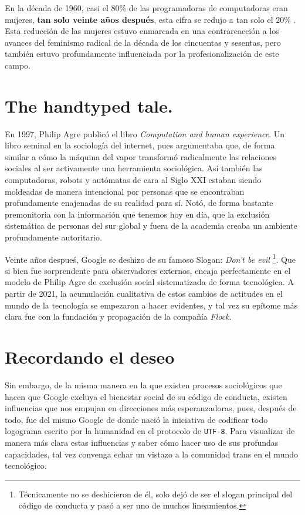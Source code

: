 \documentclass{article}
\begin{document}
	En la década de 1960, casi el 80\% de las programadoras de computadoras eran mujeres, \textbf{tan solo veinte años después}, esta cifra se redujo a tan solo el 20\% \cite{takeover}. Esta reducción de las mujeres estuvo enmarcada en una contrareacción a los avances del feminismo radical de la década de los cincuentas y sesentas, pero también estuvo profundamente influenciada por la profesionalización de este campo.
\section*{The handtyped tale.}
	En 1997, Philip Agre publicó el libro \textit{Computation and human experience}. Un libro seminal en la sociología del internet, pues argumentaba que, de forma similar a cómo la máquina del vapor transformó radicalmente las relaciones sociales al ser activamente una herramienta sociológica. Así también las computadoras, robots y autómatas de cara al Siglo XXI estaban siendo moldeadas de manera intencional por personas que se encontraban profundamente enajenadas de su realidad para sí. Notó, de forma bastante premonitoria con la información que tenemos hoy en día, que la exclusión sistemática de personas del sur global y fuera de la academia creaba un ambiente profundamente autoritario.

	Veinte años despueś, Google se deshizo de su famoso Slogan: \textit{Don't be evil} \footnote{Técnicamente no se deshicieron de él, solo dejó de ser el slogan principal del código de conducta y pasó a ser uno de muchos lineamientos.}. Que si bien fue sorprendente para observadores externos, encaja perfectamente en el modelo de Philip Agre de exclusión social sistematizada de forma tecnológica. A partir de 2021, la acumulación cualitativa de estos cambios de actitudes en el mundo de la tecnología se empezaron a hacer evidentes, y tal vez su epítome más clara fue con la fundación y propagación de la compañía \emph{Flock}.
\section*{Recordando el deseo}
	Sin embargo, de la misma manera en la que existen procesos sociológicos que hacen que Google excluya el bienestar social de su código de conducta, existen influencias que nos empujan en direcciones más esperanzadoras, pues, después de todo, fue del mismo Google de donde nació la iniciativa de codificar todo logograma escrito por la humanidad en el protocolo de \texttt{UTF-8}. Para visualizar de manera más clara estas influencias y saber cómo hacer uso de sus profundas capacidades, tal vez convenga echar un vistazo a la comunidad trans en el mundo tecnológico.
\end{document}
